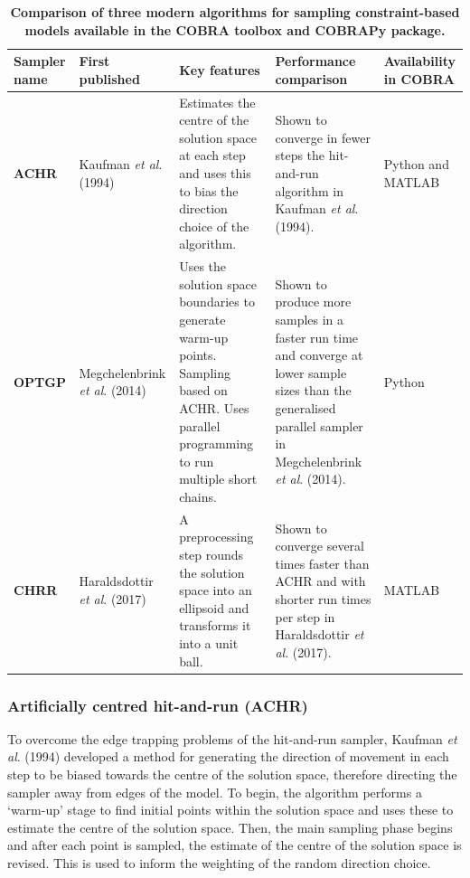 \documentclass[10pt,letterpaper]{article}
\newlength\savedwidth
\newcommand\thickhline{\noalign{\global\savedwidth\arrayrulewidth\global\arrayrulewidth 2pt}%
\hline
\noalign{\global\arrayrulewidth\savedwidth}}
\begin{document}
\begin{table}[ht!]
\begin{adjustwidth}{-2.25in}{0in}
\centering
\caption{
{\bf Comparison of three modern algorithms for sampling constraint-based models available in the COBRA toolbox and COBRAPy package.}}
\begin{tabular}{|>{\raggedright}p{2cm}>{\raggedright\arraybackslash}p{3cm}>{\raggedright\arraybackslash}p{5cm}>{\raggedright\arraybackslash}p{5cm}>{\raggedright\arraybackslash}p{2cm}|}
\hline
\textbf{Sampler name} & \textbf{First published} & \textbf{Key features} & \textbf{Performance comparison} & \textbf{Availability in COBRA} \\
\hline\hline
\textbf{ACHR} & Kaufman \textit{et al}. (1994)\cite{Kaufman} & Estimates the centre of the solution space at each step and uses this to bias the direction choice of the algorithm. & Shown to converge in fewer steps the hit-and-run algorithm in Kaufman \textit{et al}. (1994)\cite{Kaufman}. & Python and MATLAB \\
\hline
\textbf{OPTGP} & Megchelenbrink \textit{et al}. (2014)\cite{Megchelenbrink} & Uses the solution space boundaries to generate warm-up points. Sampling based on ACHR. Uses parallel programming to run multiple short chains. & Shown to produce more samples in a faster run time and converge at lower sample sizes than the generalised parallel sampler in Megchelenbrink \textit{et al}. (2014)\cite{Megchelenbrink}. & Python \\
\hline
\textbf{CHRR} & Haraldsdottir \textit{et al}. (2017)\cite{Haraldsdottir} & A preprocessing step rounds the solution space into an ellipsoid and transforms it into a unit ball. & Shown to converge several times faster than ACHR and with shorter run times per step in Haraldsdottir \textit{et al}. (2017)\cite{Haraldsdottir}. & MATLAB\\
\hline
\end{tabular}
\label{table:1}
\end{adjustwidth}
\end{table}

\subsubsection*{Artificially centred hit-and-run (ACHR)}
To overcome the edge trapping problems of the hit-and-run sampler, Kaufman \textit{et al}. (1994) developed a method for generating the direction of movement in each step to be biased towards the centre of the solution space, therefore directing the sampler away from edges of the model\cite{Kaufman}. To begin, the algorithm performs a ‘warm-up’ stage to find initial points within the solution space and uses these to estimate the centre of the solution space. Then, the main sampling phase begins and after each point is sampled, the estimate of the centre of the solution space is revised. This is used to inform the weighting of the random direction choice. 
\end{document}
